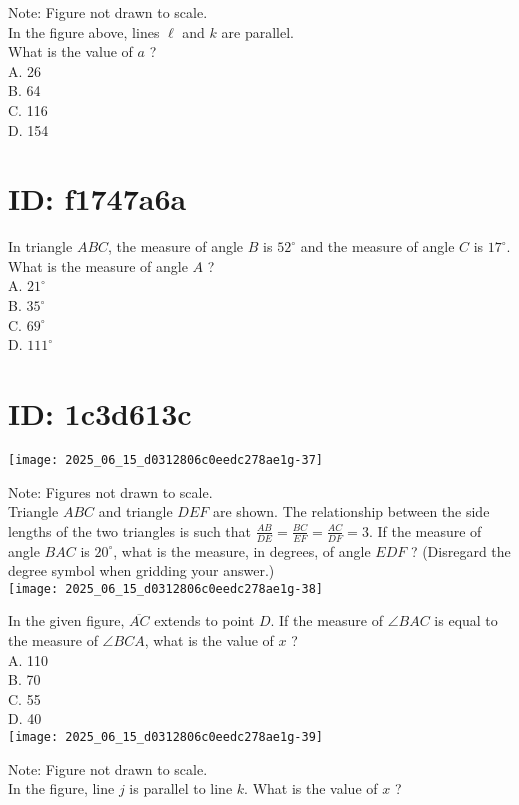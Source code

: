 Note: Figure not drawn to scale.\\
In the figure above, lines $\ell$ and $k$ are parallel.\\
What is the value of $a$ ?\\
A. 26\\
B. 64\\
C. 116\\
D. 154

\section*{ID: f1747a6a}
In triangle $A B C$, the measure of angle $B$ is $52^{\circ}$ and the measure of angle $C$ is $17^{\circ}$. What is the measure of angle $A$ ?\\
A. $21^{\circ}$\\
B. $35^{\circ}$\\
C. $69^{\circ}$\\
D. $111^{\circ}$

\section*{ID: 1c3d613c}
\begin{center}
\texttt{[image: 2025\_06\_15\_d0312806c0eedc278ae1g-37]}
\end{center}

Note: Figures not drawn to scale.\\
Triangle $A B C$ and triangle $D E F$ are shown. The relationship between the side lengths of the two triangles is such that $\frac{A B}{D E}=\frac{B C}{E F}=\frac{A C}{D F}=3$. If the measure of angle $B A C$ is $20^{\circ}$, what is the measure, in degrees, of angle $E D F$ ? (Disregard the degree symbol when gridding your answer.)\\
\texttt{[image: 2025\_06\_15\_d0312806c0eedc278ae1g-38]}

In the given figure, $\overline{A C}$ extends to point $D$. If the measure of $\angle B A C$ is equal to the measure of $\angle B C A$, what is the value of $x$ ?\\
A. 110\\
B. 70\\
C. 55\\
D. 40\\
\texttt{[image: 2025\_06\_15\_d0312806c0eedc278ae1g-39]}

Note: Figure not drawn to scale.\\
In the figure, line $j$ is parallel to line $k$. What is the value of $x$ ?

